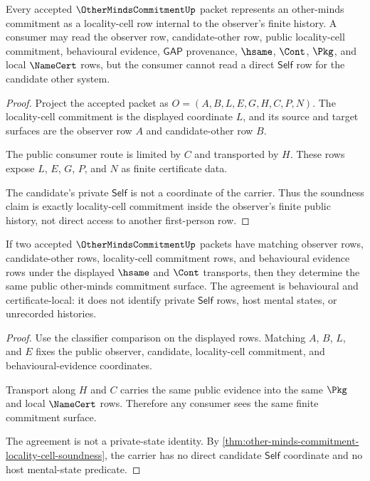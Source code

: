 \begin{theorem}
\label{thm:other-minds-commitment-locality-cell-soundness}
Every accepted $\OtherMindsCommitmentUp$ packet represents an other-minds commitment as a locality-cell row internal to the observer's finite history. A consumer may read the observer row, candidate-other row, public locality-cell commitment, behavioural evidence, $\mathsf{GAP}$ provenance, $\hsame$, $\Cont$, $\Pkg$, and local $\NameCert$ rows, but the consumer cannot read a direct $\mathsf{Self}$ row for the candidate other system.
\end{theorem}
\begin{proof}
Project the accepted packet as $O=(A,B,L,E,G,H,C,P,N)$. The locality-cell commitment is the displayed coordinate $L$, and its source and target surfaces are the observer row $A$ and candidate-other row $B$.

The public consumer route is limited by $C$ and transported by $H$. These rows expose $L$, $E$, $G$, $P$, and $N$ as finite certificate data.

The candidate's private $\mathsf{Self}$ is not a coordinate of the carrier. Thus the soundness claim is exactly locality-cell commitment inside the observer's finite public history, not direct access to another first-person row.
\end{proof}

\begin{theorem}
\label{thm:other-minds-commitment-behavioural-evidence-compatibility}
If two accepted $\OtherMindsCommitmentUp$ packets have matching observer rows, candidate-other rows, locality-cell commitment rows, and behavioural evidence rows under the displayed $\hsame$ and $\Cont$ transports, then they determine the same public other-minds commitment surface. The agreement is behavioural and certificate-local: it does not identify private $\mathsf{Self}$ rows, host mental states, or unrecorded histories.
\end{theorem}
\begin{proof}
Use the classifier comparison on the displayed rows. Matching $A$, $B$, $L$, and $E$ fixes the public observer, candidate, locality-cell commitment, and behavioural-evidence coordinates.

Transport along $H$ and $C$ carries the same public evidence into the same $\Pkg$ and local $\NameCert$ rows. Therefore any consumer sees the same finite commitment surface.

The agreement is not a private-state identity. By \autoref{thm:other-minds-commitment-locality-cell-soundness}, the carrier has no direct candidate $\mathsf{Self}$ coordinate and no host mental-state predicate.
\end{proof}

